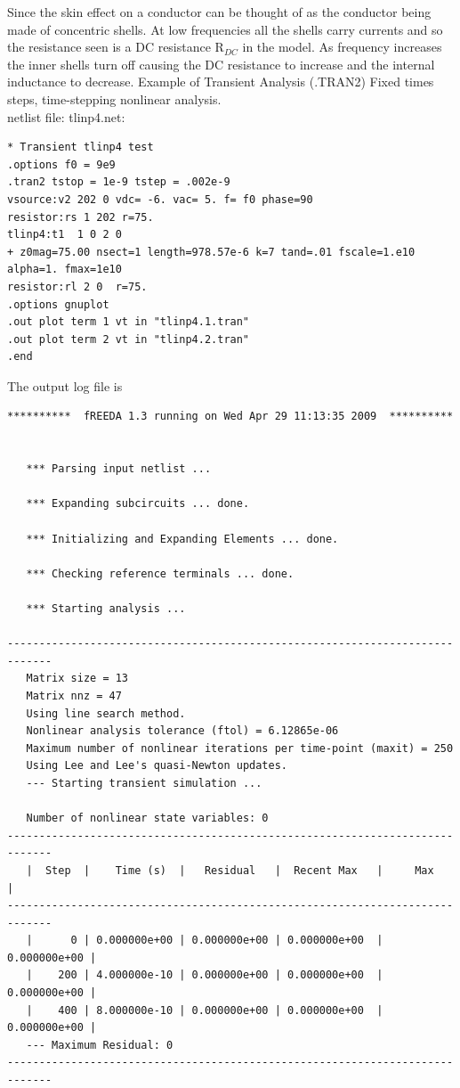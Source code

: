 \documentclass{article}
\begin{document}
{Since the skin effect on a conductor can be thought of as the conductor being made of concentric shells.  At low frequencies all the shells carry currents and so the resistance seen is a DC resistance R$_{DC}$ in the model.  As frequency increases the inner shells turn off causing the DC resistance to increase and the internal inductance to decrease.
\myThickLine
Example of Transient Analysis (.TRAN2) Fixed times steps, time-stepping nonlinear analysis.\\
netlist file: tlinp4.net:
\begin{verbatim}
* Transient tlinp4 test
.options f0 = 9e9
.tran2 tstop = 1e-9 tstep = .002e-9
vsource:v2 202 0 vdc= -6. vac= 5. f= f0 phase=90
resistor:rs 1 202 r=75.
tlinp4:t1  1 0 2 0
+ z0mag=75.00 nsect=1 length=978.57e-6 k=7 tand=.01 fscale=1.e10 alpha=1. fmax=1e10
resistor:rl 2 0  r=75.
.options gnuplot
.out plot term 1 vt in "tlinp4.1.tran"
.out plot term 2 vt in "tlinp4.2.tran"
.end
\end{verbatim}
The output log file is
\begin{verbatim}
**********  fREEDA 1.3 running on Wed Apr 29 11:13:35 2009  **********


   *** Parsing input netlist ...

   *** Expanding subcircuits ... done.

   *** Initializing and Expanding Elements ... done.

   *** Checking reference terminals ... done.

   *** Starting analysis ...

-----------------------------------------------------------------------------
   Matrix size = 13
   Matrix nnz = 47
   Using line search method.
   Nonlinear analysis tolerance (ftol) = 6.12865e-06
   Maximum number of nonlinear iterations per time-point (maxit) = 250
   Using Lee and Lee's quasi-Newton updates.
   --- Starting transient simulation ...

   Number of nonlinear state variables: 0
-----------------------------------------------------------------------------
   |  Step  |    Time (s)  |   Residual   |  Recent Max   |     Max      |
-----------------------------------------------------------------------------
   |      0 | 0.000000e+00 | 0.000000e+00 | 0.000000e+00  | 0.000000e+00 |
   |    200 | 4.000000e-10 | 0.000000e+00 | 0.000000e+00  | 0.000000e+00 |
   |    400 | 8.000000e-10 | 0.000000e+00 | 0.000000e+00  | 0.000000e+00 |
   --- Maximum Residual: 0
-----------------------------------------------------------------------------


\end{verbatim}}
\end{document}
